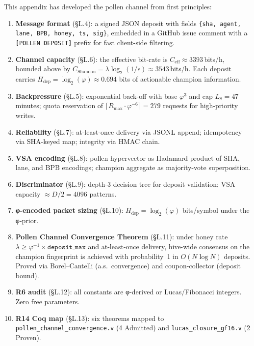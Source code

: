 This appendix has developed the pollen channel from first principles:

\begin{enumerate}
\item \textbf{Message format} (§L.4): a signed JSON deposit with fields
  \texttt{\{sha, agent, lane, BPB, honey, ts, sig\}}, embedded in a
  GitHub issue comment with a \texttt{[POLLEN DEPOSIT]} prefix for
  fast client-side filtering.

\item \textbf{Channel capacity} (§L.6): the effective bit-rate is
  $C_{\text{eff}} \approx 3393$\,bits/h, bounded above by
  $C_{\text{Shannon}} = \lambda \log_{2}(1/\epsilon) \approx 3543$\,bits/h.
  Each deposit carries $H_{\text{dep}} = \log_{2}(\varphi) \approx 0.694$
  bits of actionable champion information.

\item \textbf{Backpressure} (§L.5): exponential back-off with base
  $\varphi^{3}$ and cap $L_{8} = 47$ minutes; quota reservation of
  $\lceil R_{\max} \cdot \varphi^{-6} \rceil = 279$ requests for
  high-priority writes.

\item \textbf{Reliability} (§L.7): at-least-once delivery via JSONL
  append; idempotency via SHA-keyed map; integrity via HMAC chain.

\item \textbf{VSA encoding} (§L.8): pollen hypervector as Hadamard
  product of SHA, lane, and BPB encodings; champion aggregate as
  majority-vote superposition.

\item \textbf{Discriminator} (§L.9): depth-3 decision tree for
  deposit validation; VSA capacity $\approx D/2 = 4096$ patterns.

\item \textbf{φ-encoded packet sizing} (§L.10): $H_{\text{dep}} =
  \log_{2}(\varphi)$ bits/symbol under the φ-prior.

\item \textbf{Pollen Channel Convergence Theorem} (§L.11): under
  honey rate $\lambda \geq \varphi^{-1} \times \texttt{deposit\_max}$
  and at-least-once delivery, hive-wide consensus on the champion
  fingerprint is achieved with probability~1 in $O(N \log N)$ deposits.
  Proved via Borel--Cantelli (a.s.\ convergence) and coupon-collector
  (deposit bound).

\item \textbf{R6 audit} (§L.12): all constants are φ-derived or
  Lucas/Fibonacci integers.  Zero free parameters.

\item \textbf{R14 Coq map} (§L.13): six theorems mapped to
  \texttt{pollen\_channel\_convergence.v} (4 Admitted) and
  \texttt{lucas\_closure\_gf16.v} (2 Proven).
\end{enumerate}

